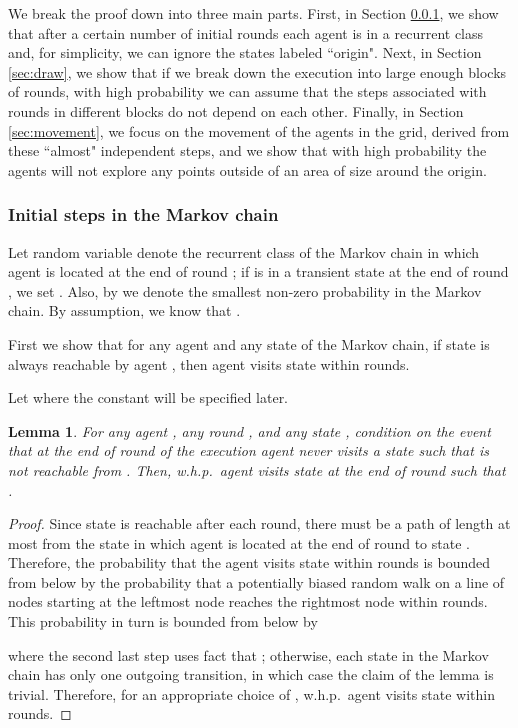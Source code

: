 \documentclass[11pt]{article}
\newtheorem{lemma}[theorem]{Lemma}
\begin{document}
We break the proof down into three main parts. First, in Section \ref{sec:initial}, we show that after a certain number of initial rounds each agent is in a recurrent class and, for simplicity, we can ignore the states labeled ``origin". Next, in Section \ref{sec:draw}, we show that if we break down the execution into large enough blocks of rounds, with high probability  we can assume that the steps associated with rounds in different blocks do not depend on each other. Finally, in Section \ref{sec:movement}, we focus on the movement of the agents in the grid, derived from these ``almost" independent steps, and we show that with high probability the agents will not explore any points outside of an area of size  around the origin.


\subsubsection{Initial steps in the Markov chain}
\label{sec:initial}

Let random variable  denote the recurrent class of the Markov chain in which agent  is located at the end of round ; if  is in a transient state at the end of round , we set . Also, by  we denote the smallest non-zero probability in the Markov chain. By assumption, we know that .

First we show that for any agent  and any state  of the Markov chain, if state  is always reachable by agent , then agent  visits state  within  rounds.

Let  where the constant  will be specified later.

\begin{lemma}
\label{lem:reach}
For any agent , any round , and any state , condition on the event that at the end of round  of the execution agent  never visits a state  such that  is not reachable from . Then, w.h.p.\ agent  visits state  at the end of round  such that .
\end{lemma}
\begin{proof}
	Since state  is reachable after each round, there must be a path of length at most  from the state in which agent  is located at the end of round  to state . Therefore, the probability that the agent visits state  within  rounds is bounded from below by the probability that a potentially biased random walk on a line of  nodes starting at the leftmost node reaches the rightmost node within  rounds. This probability in turn is bounded from below by

where the second last step uses fact that ; otherwise, each state in the Markov chain has only one outgoing transition, in which case the claim of the lemma is trivial.
Therefore, for an appropriate choice of , w.h.p.\ agent  visits state  within  rounds.
\end{proof}
\end{document}
